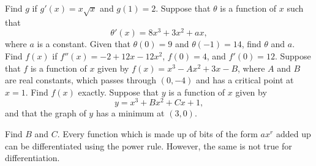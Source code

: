\begin{questions}
  \question Find $ g $ if $ g'(x) = x \sqrt{x} $ and $ g(1) =  2 $.
  \question Suppose that $ \theta $ is a function of $ x $ such that
            \begin{displaymath}
              \theta'(x) = 8x^3 + 3x^2 + ax,
            \end{displaymath}
            where $ a $ is a constant. Given that $ \theta(0) = 9 $ and $ \theta(-1) = 14 $, find $ \theta $ and $ a $.
  \question Find $ f(x) $ if $ f''(x) = -2 + 12x - 12x^2 $, $ f(0) = 4 $, and $ f'(0) = 12 $.
  \question Suppose that $ f $ is a function of $ x $ given by $ f(x) = x^3 - Ax^2 + 3x - B $, where $ A $ and $ B $ are real constants,
            which passes through $ (0,-4) $ and has a critical point at $ x = 1 $. Find $ f(x) $ exactly.
  \question Suppose that $ y $ is a function of $ x $ given by
            \begin{displaymath}
              y = x^3 + Bx^2 + Cx + 1,
            \end{displaymath}
            and that the graph of $ y $ has a minimum at $ (3,0) $.

            Find $ B $ and $ C $.
  \question Every function which is made up of bits of the form $ ax^r $ added up can be differentiated using the power rule.
            However, the same is not true for differentiation.
\end{questions}
